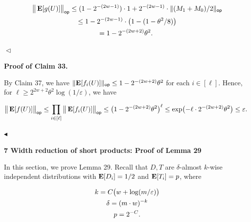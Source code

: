 \[\begin{gathered}
\displaystyle\big{\lVert}\mathop{\bf E\/}[g(U)]\big{\rVert}_{\mathsf{op}} \displaystyle\leq(1-2^{-(2w-1)})\cdot 1+2^{-(2w-1)}\cdot\lVert(M_{1}+M_{0})/2\rVert_{\mathsf{op}} \\
\displaystyle\leq 1-2^{-(2w-1)}\cdot\bigl{(}1-(1-\theta^{2}/8)\bigr{)} \\
\displaystyle=1-2^{-(2w+2)}\theta^{2}.\
\end{gathered}\]


$\vartriangleleft$\par





\par\medskip\noindent\textbf{Proof of Claim 33.}\par




By Claim 37, we have $\lVert\mathop{\bf E\/}[f_{i}(U)]\rVert_{\mathsf{op}}\leq 1-2^{-(2w+2)}\theta^{2}$ for each $i\in[\ell]$.
Hence, for $\ell\geq 2^{2w+2}\theta^{2}\log(1/\varepsilon)$, we have\par


\[\begin{gathered}
\big{\lVert}\mathop{\bf E\/}[f(U)]\big{\rVert}_{\mathsf{op}}\leq\prod_{i\in[\ell]}\big{\lVert}\mathop{\bf E\/}[f_{i}(U)]\big{\rVert}_{\mathsf{op}}\leq\bigl{(}1-2^{-(2w+2)}\theta^{2}\bigr{)}^{\ell}\leq\exp\bigl{(}-\ell\cdot 2^{-(2w+2)}\theta^{2}\bigr{)}\leq\varepsilon.\
\end{gathered}\]


$\blacktriangleleft$\par








\par\medskip\noindent\textbf{
7 Width reduction of short products: Proof of Lemma 29
}\par




In this section, we prove Lemma 29.
Recall that $D,T$ are $\delta$-almost $k$-wise independent distributions with $\mathop{\bf E\/}[D_{i}]=1/2$ and $\mathop{\bf E\/}[T_{i}]=p$, where\par


\[\begin{gathered}
\displaystyle k \displaystyle=C\bigl{(}w+\log(m/\varepsilon)\bigr{)} \\
\displaystyle\delta \displaystyle=(m\cdot w)^{-k} \\
\displaystyle p \displaystyle=2^{-C}.
\end{gathered}\]


